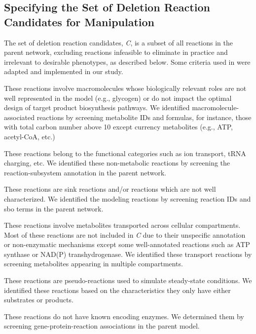 \subsection{Specifying the Set of Deletion Reaction Candidates for Manipulation} \label{sec:cand}

The set of deletion reaction candidates, \textit{C}, is a subset of all reactions in the parent network, excluding reactions infeasible to eliminate in practice and irrelevant to desirable phenotypes, as described below. Some criteria  used in \citep{feist2010} were adapted and implemented in our study.

	 These reactions involve macromolecules whose biologically relevant roles are not well represented in the model (e.g., glycogen) or do not impact the optimal design of target product biosynthesis pathways. We identified macromolecule-associated reactions by screening metabolite IDs and formulas, for instance, those with total carbon number above 10 except currency metabolites (e.g., ATP, acetyl-CoA, etc.)

	 These reactions belong to the functional categories such as ion transport, tRNA charging, etc. We identified these non-metabolic reactions by screening the reaction-subsystem annotation in the parent network.

	 These reactions are sink reactions and/or reactions which are not well characterized. We identified the modeling reactions by screening reaction IDs and sbo terms in the parent network.

	 These reactions involve metabolites transported across cellular compartments. Most of these reactions are not included in \textit{C} due to their unspecific annotation or non-enzymatic mechanisms except some well-annotated reactions such as ATP synthase or NAD(P) transhydrogenase. We identified these transport reactions by screening metabolites appearing in multiple compartments.

	 These reactions are pseudo-reactions used to simulate steady-state conditions. We identified these reactions based on the characteristics they only have either substrates or products.

	 These reactions do not have known encoding enzymes. We determined them by screening gene-protein-reaction associations in the parent model.

